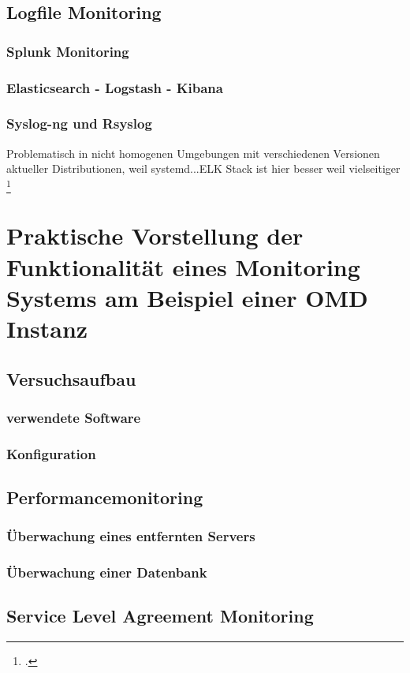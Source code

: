 \documentclass[12pt,a4paper,parskip]{scrreprt}
\begin{document}
	\section{Logfile Monitoring}
	\subsection{Splunk Monitoring}
	\subsection{Elasticsearch - Logstash - Kibana}
	\subsection{Syslog-ng und Rsyslog}
	Problematisch in nicht homogenen Umgebungen mit verschiedenen Versionen aktueller Distributionen, weil systemd...ELK Stack ist hier besser weil vielseitiger
	\footcite{systemd2015}
	\chapter{Praktische Vorstellung der Funktionalität eines Monitoring Systems am Beispiel einer OMD Instanz}
	\section{Versuchsaufbau}
	\subsection{verwendete Software}
	
	\subsection{Konfiguration}
	\section{Performancemonitoring}
	\subsection{Überwachung eines entfernten Servers}
	\subsection{Überwachung einer Datenbank}
	\section{Service Level Agreement Monitoring}
\end{document}

